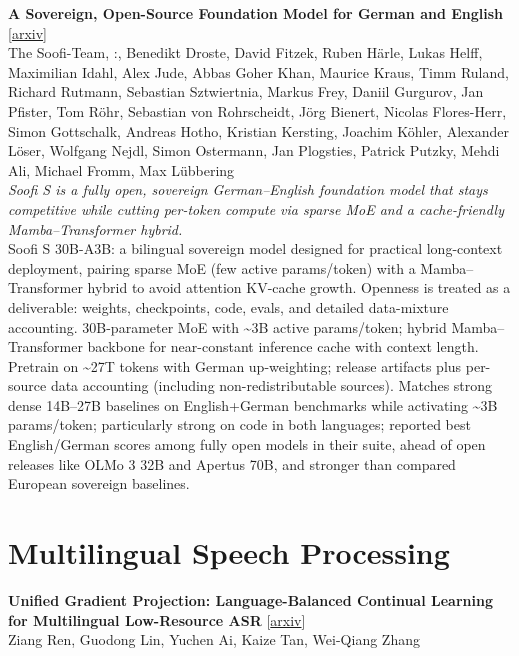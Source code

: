 \documentclass[12pt,letterpaper]{article}
\begin{document}
\medskip

{\small\textbf{A Sovereign, Open-Source Foundation Model for German and English}} {\scriptsize[\href{https://arxiv.org/abs/2607.09424}{arxiv}]}\\
{\scriptsize The Soofi-Team,  :, Benedikt Droste, David Fitzek, Ruben H\"arle, Lukas Helff, Maximilian Idahl, Alex Jude, Abbas Goher Khan, Maurice Kraus, Timm Ruland, Richard Rutmann, Sebastian Sztwiertnia, Markus Frey, Daniil Gurgurov, Jan Pfister, Tom R\"ohr, Sebastian von Rohrscheidt, J\"org Bienert, Nicolas Flores-Herr, Simon Gottschalk, Andreas Hotho, Kristian Kersting, Joachim K\"ohler, Alexander L\"oser, Wolfgang Nejdl, Simon Ostermann, Jan Plogsties, Patrick Putzky, Mehdi Ali, Michael Fromm, Max L\"ubbering}\\

{\small\textit{Soofi S is a fully open, sovereign German--English foundation model that stays competitive while cutting per-token compute via sparse MoE and a cache-friendly Mamba--Transformer hybrid.}}\\[1pt]
{\footnotesize Soofi S 30B-A3B: a bilingual sovereign model designed for practical long-context deployment, pairing sparse MoE (few active params/token) with a Mamba--Transformer hybrid to avoid attention KV-cache growth. Openness is treated as a deliverable: weights, checkpoints, code, evals, and detailed data-mixture accounting. 30B-parameter MoE with \textasciitilde{}3B active params/token; hybrid Mamba--Transformer backbone for near-constant inference cache with context length. Pretrain on \textasciitilde{}27T tokens with German up-weighting; release artifacts plus per-source data accounting (including non-redistributable sources). Matches strong dense 14B--27B baselines on English+German benchmarks while activating \textasciitilde{}3B params/token; particularly strong on code in both languages; reported best English/German scores among fully open models in their suite, ahead of open releases like OLMo 3 32B and Apertus 70B, and stronger than compared European sovereign baselines.}

\medskip


\section*{Multilingual Speech Processing}

{\small\textbf{Unified Gradient Projection: Language-Balanced Continual Learning for Multilingual Low-Resource ASR}} {\scriptsize[\href{https://arxiv.org/abs/2607.11163}{arxiv}]}\\
{\scriptsize Ziang Ren, Guodong Lin, Yuchen Ai, Kaize Tan, Wei-Qiang Zhang}\\
\end{document}
